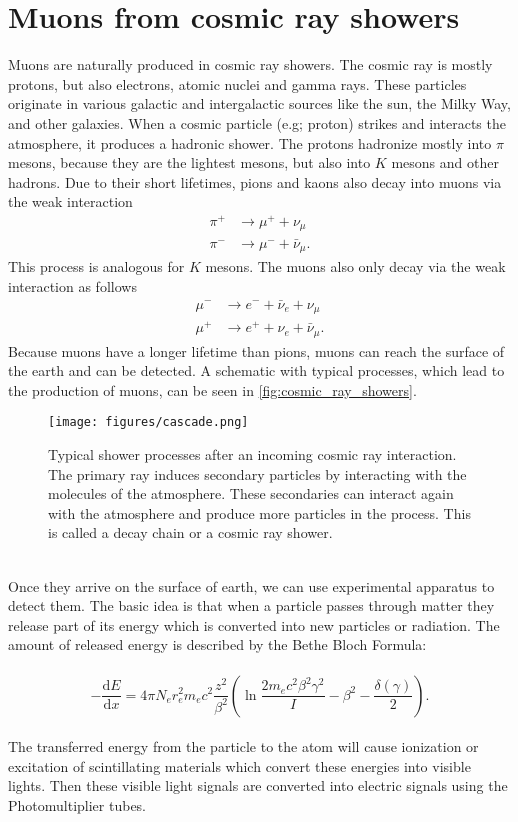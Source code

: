 \section{Muons from cosmic ray showers} 
Muons are naturally produced in cosmic ray showers.
The cosmic ray is mostly protons, but also electrons, atomic nuclei and gamma rays.
These particles originate in various galactic and intergalactic sources like the sun, the Milky Way, and other galaxies.
When a cosmic particle (e.g; proton) strikes and interacts the atmosphere, it produces a hadronic shower.
The protons hadronize mostly into $\pi$ mesons, because they are the lightest mesons, but also into $K$ mesons and other hadrons.
Due to their short lifetimes, pions and kaons also decay into muons via the weak interaction 
\begin{align*}
    \pi^{+} &\to \mu^{+} + \nu_{\mu} \\
    \pi^{-} &\to \mu^{-} + \bar{\nu}_{\mu}.
\end{align*}
This process is analogous for $K$ mesons.
The muons also only decay via the weak interaction as follows 
\begin{align*}
    \mu^{-} &\to e^{-} + \bar{\nu}_{e} + {\nu}_{\mu} \\
    \mu^{+} &\to e^{+} + \nu_{e} + \bar{\nu}_{\mu}.
\end{align*}
Because muons have a longer lifetime than pions, muons can reach the surface of the earth and 
can be detected. 
A schematic with typical processes, which lead to the production of muons, can be seen in \autoref{fig:cosmic_ray_showers}.
\begin{figure}
    \centering
    \texttt{[image: figures/cascade.png]}
    \caption{Typical shower processes after an incoming cosmic ray interaction. The primary ray induces secondary particles by interacting with the 
    molecules of the atmosphere. These secondaries can interact again with the atmosphere and produce more particles in the process. 
    This is called a decay chain or a cosmic ray shower\cite{nasa}.}
    \label{fig:cosmic_ray_showers}
\end{figure}
\\
Once they arrive on the surface of earth, we can use experimental apparatus to detect them.
The basic idea is that when a particle passes through matter they release part of its energy which is converted into new particles or radiation.
The amount of released energy is described by the Bethe Bloch Formula:\\\\
\begin{equation*}
    -\frac{\mathrm dE}{\mathrm dx} = 4 \pi N_e r^2_e m_e c^2 \frac{z^2}{\beta^2}\left(\ln{\frac{2m_e c^2\beta^2 \gamma^2}{I}-\beta^2-\frac{\delta(\gamma)}{2}}\right).
\end{equation*}
\\
The transferred energy from the particle to the atom will cause ionization or excitation 
of scintillating materials which convert these energies into visible lights. Then these 
visible light signals are converted into electric signals using the Photomultiplier tubes.
